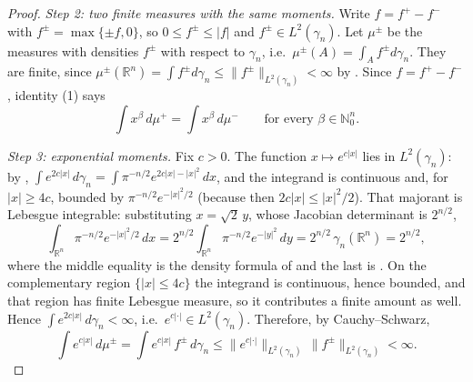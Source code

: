 \begin{proof}
\emph{Step 2: two finite measures with the same moments.}
Write $f = f^+ - f^-$ with $f^\pm = \max\{\pm f, 0\}$, so $0 \leq f^\pm \leq |f|$
and $f^\pm \in L^2(\gamma_n)$.  Let $\mu^\pm$ be the measures with densities
$f^\pm$ with respect to $\gamma_n$, i.e.\ $\mu^\pm(A) = \int_A f^\pm d\gamma_n$.
They are finite, since $\mu^\pm(\mathbb{R}^n) = \int f^\pm d\gamma_n \leq
\|f^\pm\|_{L^2(\gamma_n)} < \infty$ by .  Since
$f = f^+ - f^-$, identity (1) says
\begin{equation*}
  \int x^\beta\, d\mu^+ = \int x^\beta\, d\mu^-
  \qquad\text{for every } \beta \in \mathbb{N}_0^n. \tag{2}
\end{equation*}

\emph{Step 3: exponential moments.}
Fix $c > 0$.  The function $x \mapsto e^{c|x|}$ lies in $L^2(\gamma_n)$: by
,
$\int e^{2c|x|}\, d\gamma_n = \int \pi^{-n/2} e^{2c|x| - |x|^2}\, dx$, and the
integrand is continuous and, for $|x| \geq 4c$, bounded by
$\pi^{-n/2}e^{-|x|^2/2}$ (because then $2c|x| \leq |x|^2/2$).  That majorant is
Lebesgue integrable: substituting $x = \sqrt2\,y$, whose Jacobian determinant is
$2^{n/2}$,
\[
  \int_{\mathbb{R}^n} \pi^{-n/2} e^{-|x|^2/2}\, dx
    = 2^{n/2}\int_{\mathbb{R}^n} \pi^{-n/2} e^{-|y|^2}\, dy
    = 2^{n/2}\,\gamma_n(\mathbb{R}^n)
    = 2^{n/2},
\]
where the middle equality is the density formula of  and the
last is .  On the complementary region $\{|x| \leq 4c\}$ the
integrand is continuous, hence bounded, and that region has finite Lebesgue
measure, so it contributes a finite amount as well.  Hence
$\int e^{2c|x|}\, d\gamma_n < \infty$, i.e.\ $e^{c|\cdot|} \in L^2(\gamma_n)$.
Therefore, by Cauchy--Schwarz,
\begin{equation*}
  \int e^{c|x|}\, d\mu^\pm
    = \int e^{c|x|}\, f^\pm \, d\gamma_n
    \leq \|e^{c|\cdot|}\|_{L^2(\gamma_n)}\, \|f^\pm\|_{L^2(\gamma_n)}
    < \infty . \tag{3}
\end{equation*}


\end{proof}

